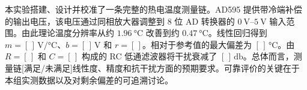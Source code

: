本实验搭建、设计并校准了一条完整的热电温度测量链。AD595 提供带冷端补偿的输出电压，该电压通过同相放大器调整到 8 位 AD 转换器的 $\SIrange{0}{5}{\volt}$ 输入范围。由此理论温度分辨率从约 $\SI{1.96}{\celsius}$ 改善到约 $\SI{0.47}{\celsius}$。线性回归得到 $m = [\,]\,\si{\volt\per\celsius}$、$b = [\,]\,\si{\volt}$ 和 $r = [\,]$。相对于参考值的最大偏差为 $[\,]\,\si{\celsius}$。由 $R = [\,]$ 和 $C = [\,]$ 构成的 RC 低通滤波器将干扰衰减了 $[\,]\,\si{\decibel}$。总体而言，测量链[满足/未满足]线性度、精度和抗干扰方面的预期要求。可靠评价的关键在于本组实测数据以及对剩余偏差的可追溯讨论。
